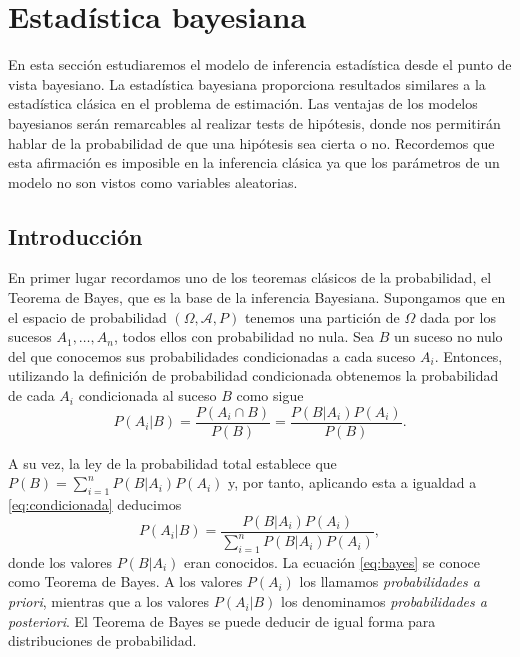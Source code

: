 

\section{Estadística bayesiana} \label{sec:bayes}

En esta sección estudiaremos el modelo de inferencia estadística desde el punto de vista bayesiano. La estadística bayesiana proporciona resultados similares a la estadística clásica en el problema de estimación. Las ventajas de los modelos bayesianos serán remarcables al realizar tests de hipótesis, donde nos permitirán hablar de la probabilidad de que una hipótesis sea cierta o no. Recordemos que esta afirmación es imposible en la inferencia clásica ya que los parámetros de un modelo no son vistos como variables aleatorias.

\subsection{Introducción}

En primer lugar recordamos uno de los teoremas clásicos de la probabilidad, el Teorema de Bayes, que es la base de la inferencia Bayesiana. Supongamos que en el espacio de probabilidad $(\Omega,\mathcal{A},P)$ tenemos una partición de $\Omega$ dada por los sucesos $A_1,\ldots,A_n$, todos ellos con probabilidad no nula. Sea $B$ un suceso no nulo del que conocemos sus probabilidades condicionadas a cada suceso $A_i$. Entonces, utilizando la definición de probabilidad condicionada obtenemos la probabilidad de cada $A_i$ condicionada al suceso $B$ como sigue
\begin{equation} \label{eq:condicionada}
	P(A_i|B)=\frac{P(A_i\cap B)}{P(B)}=\frac{P(B|A_i)P(A_i)}{P(B)}.
\end{equation}

A su vez, la ley de la probabilidad total establece que $P(B)=\sum_{i=1}^n{P(B|A_i)P(A_i)}$ y, por tanto, aplicando esta a igualdad a \eqref{eq:condicionada} deducimos
\begin{equation} \label{eq:bayes}
	P(A_i|B)=\frac{P(B|A_i)P(A_i)}{\sum_{i=1}^n{P(B|A_i)P(A_i)}},
\end{equation}
donde los valores $P(B|A_i)$ eran conocidos. La ecuación \eqref{eq:bayes} se conoce como Teorema de Bayes. A los valores $P(A_i)$ los llamamos \emph{probabilidades a priori}, mientras que a los valores $P(A_i|B)$ los denominamos \emph{probabilidades a posteriori}. El Teorema de Bayes se puede deducir de igual forma para distribuciones de probabilidad.

